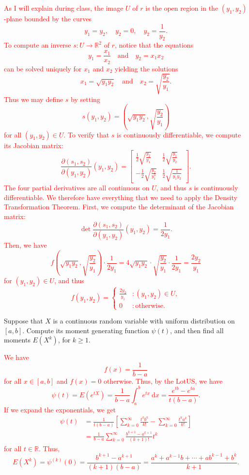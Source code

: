 \documentclass[12pt,reqno]{amsart}
\begin{document}
\bigskip
\textcolor{red}{As I will explain during class, the image $U$ of $r$ is the open region in the $(y_1,y_2)$-plane bounded by the curves
	\[y_1 = y_2, \quad y_2 = 0, \quad y_2 = \frac{1}{y_2}.
	\]
To compute an inverse $s:U\to \mathbb{R}^2$ of $r$, notice that the equations
	\[y_1 = \frac{x_1}{x_2} \quad \text{and} \quad y_2 = x_1 x_2
	\]
can be solved uniquely for $x_1$ and $x_2$ yielding the solutions
	\[x_1 = \sqrt{y_1y_2} \quad \text{and} \quad x_2 = \sqrt{ \frac{y_2}{y_1}}.
	\]
Thus we may define $s$ by setting 
	\[s(y_1,y_2) = \left( \sqrt{y_1y_2}, \sqrt{ \frac{y_2}{y_1}}\right)
	\]
for all $(y_1,y_2) \in U$. To verify that $s$ is continuously differentiable, we compute its Jacobian matrix:
	\[\frac{\partial(s_1,s_2)}{\partial (y_1,y_2)}(y_1,y_2) = \begin{bmatrix}
	\frac{1}{2} \sqrt{\frac{y_2}{y_1}} & \frac{1}{2} \sqrt{\frac{y_1}{y_2}} \\
	-\frac{1}{2} \sqrt{ \frac{y_2}{y_1^3}} & \frac{1}{2} \sqrt{\frac{1}{y_1y_2}}
	\end{bmatrix}.
	\]
The four partial derivatives are all continuous on $U$, and thus $s$ is continuously differentiable. We therefore have everything that we need to apply the Density Transformation Theorem. First, we compute the determinant of the Jacobian matrix:
	\[\det \frac{\partial(s_1,s_2)}{\partial (y_1,y_2)}(y_1,y_2)  = \frac{1}{2y_1}.
	\]
Then, we have
	\[f\left( \sqrt{y_1y_2},\sqrt{\frac{y_2}{y_1}} \right)\cdot \frac{1}{2y_1} = 4\sqrt{y_1y_2}\cdot \sqrt{\frac{y_2}{y_1}}\cdot \frac{1}{2y_1} = \frac{2y_2}{y_1}
	\]
for $(y_1,y_2) \in U$, and thus
	\[f(y_1,y_2) = \begin{cases}
	\frac{2y_2}{y_1} & : (y_1,y_2) \in U, \\
	0 & : \text{otherwise}.
	\end{cases}
	\]}
\bigskip



\prob Suppose that $X$ is a continuous random variable with uniform distribution on $[a,b]$. Compute its moment generating function $\psi(t)$, and then find all moments $E(X^k)$, for $k\geq 1$.

\bigskip
\textcolor{red}{We have
	\[f(x) = \frac{1}{b-a}
	\]
for all $x\in [a,b]$ and $f(x) = 0$ otherwise. Thus, by the LotUS, we have
	\[\psi(t) = E(e^{tX}) = \frac{1}{b-a} \int_a^b e^{tx} \ \text{d}x = \frac{e^{tb} - e^{ta}}{t(b-a)}.
	\]
If we expand the exponentials, we get
	\begin{align*}
	\psi(t) &= \frac{1}{t(b-a)} \left[ \sum_{k=0}^\infty \frac{t^kb^k}{k!} - \sum_{k=0}^\infty \frac{t^ka^k}{k!} \right] \\
	&= \frac{1}{b-a} \sum_{k=0}^\infty \frac{b^{k+1} - a^{k+1}}{(k+1)!} t^k
	\end{align*}
for all $t\in \mathbb{R}$. Thus,
	\[E(X^k) = \psi^{(k)}(0) = \frac{b^{k+1} - a^{k+1}}{(k+1)(b-a)} = \frac{a^k + a^{k-1}b + \cdots + ab^{k-1} + b^k}{k+1}.
	\]}
\bigskip
\end{document}
